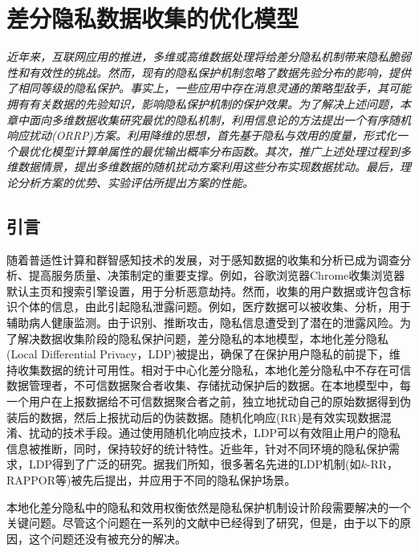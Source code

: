 \chapter{差分隐私数据收集的优化模型}\label{chapter05}

{\em
	近年来，互联网应用的推进，多维或高维数据处理将给差分隐私机制带来隐私脆弱性和有效性的挑战。然而，现有的隐私保护机制忽略了数据先验分布的影响，提供了相同等级的隐私保护。事实上，一些应用中存在消息灵通的策略型敌手，其可能拥有有关数据的先验知识，影响隐私保护机制的保护效果。为了解决上述问题，本章中面向多维数据收集研究最优的隐私机制，利用信息论的方法提出一个有序随机响应扰动(ORRP)方案。利用降维的思想，首先基于隐私与效用的度量，形式化一个最优化模型计算单属性的最优输出概率分布函数。其次，推广上述处理过程到多维数据情景，提出多维数据的随机扰动方案利用这些分布实现数据扰动。最后，理论分析方案的优势、实验评估所提出方案的性能。
}

\section{引言}\label{sec:chapter06_introduction}
随着普适性计算和群智感知技术的发展，对于感知数据的收集和分析已成为调查分析、提高服务质量、决策制定的重要支撑。例如，谷歌\cite{erlingsson2014rappor}浏览器Chrome收集浏览器默认主页和搜索引擎设置，用于分析恶意劫持。然而，收集的用户数据或许包含标识个体的信息，由此引起隐私泄露问题。例如，医疗数据可以被收集、分析，用于辅助病人健康监测。由于识别、推断攻击，隐私信息遭受到了潜在的泄露风险。为了解决数据收集阶段的隐私保护问题，差分隐私\cite{dwork2006differential,dwork2006calibrating,dwork2014algorithmic}的本地模型，本地化差分隐私(Local Differential Privacy，LDP)\cite{duchi2013local}被提出，确保了在保护用户隐私的前提下，维持收集数据的统计可用性。相对于中心化差分隐私，本地化差分隐私中不存在可信数据管理者，不可信数据聚合者收集、存储扰动保护后的数据。在本地模型中，每一个用户在上报数据给不可信数据聚合者之前，独立地扰动自己的原始数据得到伪装后的数据，然后上报扰动后的伪装数据。随机化响应(RR)是有效实现数据混淆、扰动的技术手段。通过使用随机化响应技术，LDP可以有效阻止用户的隐私信息被推断，同时，保持较好的统计特性。近些年，针对不同环境的隐私保护需求，LDP得到了广泛的研究\cite{wang2019collecting,gu2020providing,murakami2019utility}。据我们所知，很多著名先进的LDP机制(如$k$-RR\cite{kairouz2016extremal}，RAPPOR\cite{fanti2016building,erlingsson2014rappor}等)被先后提出，并应用于不同的隐私保护场景。


本地化差分隐私中的隐私和效用权衡依然是隐私保护机制设计阶段需要解决的一个关键问题。尽管这个问题在一系列的文献中已经得到了研究\cite{holohan2017optimal,kalantari2018robust,rassouli2020optimal}，但是，由于以下的原因，这个问题还没有被充分的解决。

